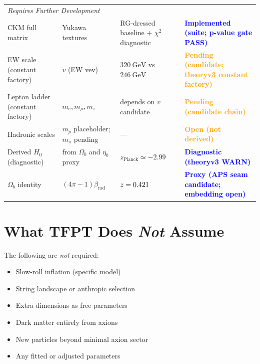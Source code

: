 \begin{longtable}{@{}p{3cm}p{4cm}p{3cm}p{5.2cm}@{}}
\midrule
\multicolumn{4}{l}{\textit{Requires Further Development}}\\
\quad CKM full matrix & Yukawa textures & RG-dressed baseline + $\chi^2$ diagnostic & \textcolor{blue}{\textbf{Implemented (suite; p-value gate PASS)}}\\
\quad EW scale (constant factory) & $v$ (EW vev) & $320~\mathrm{GeV}$ vs $246~\mathrm{GeV}$ & \textcolor{orange}{\textbf{Pending (candidate; theoryv3 constant factory)}}\\
\quad Lepton ladder (constant factory) & $m_e, m_\mu, m_\tau$ & depends on $v$ candidate & \textcolor{orange}{\textbf{Pending (candidate chain)}}\\
\quad Hadronic scales & $m_p$ placeholder; $m_\pi$ pending & --- & \textcolor{orange}{\textbf{Open (not derived)}}\\
\quad Derived $H_0$ (diagnostic) & from $\Omega_b$ and $\eta_b$ proxy & $z_{\mathrm{Planck}}\simeq -2.99$ & \textcolor{blue}{\textbf{Diagnostic (theoryv3 WARN)}}\\
\quad $\Omega_b$ identity & $(4\pi-1)\beta_{\text{rad}}$ & $z=\num[round-mode=places,round-precision=3]{\TFPTOmegaBZ}$ & \textcolor{blue}{\textbf{Proxy (APS seam candidate; embedding open)}}\\
\end{longtable}
\endgroup

\section{What TFPT Does \emph{Not} Assume}

The following are \emph{not} required:
\begin{itemize}[leftmargin=2em]
    \item[\ding{55}] Slow-roll inflation (specific model)
    \item[\ding{55}] String landscape or anthropic selection
    \item[\ding{55}] Extra dimensions as free parameters
    \item[\ding{55}] Dark matter entirely from axions
    \item[\ding{55}] New particles beyond minimal axion sector
    \item[\ding{55}] Any fitted or adjusted parameters
\end{itemize}

